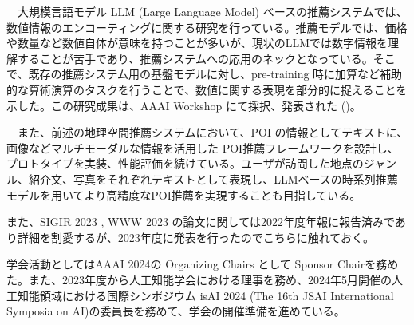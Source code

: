 　大規模言語モデル LLM (Large Language Model) ベースの推薦システムでは、数値情報のエンコーティングに関する研究を行っている。推薦モデルでは、価格や数量など数値自体が意味を持つことが多いが、現状のLLMでは数字情報を理解することが苦手であり、推薦システムへの応用のネックとなっている。そこで、既存の推薦システム用の基盤モデルに対し、pre-training 時に加算など補助的な算術演算のタスクを行うことで、数値に関する表現を部分的に捉えることを示した。この研究成果は、AAAI Workshop にて採択、発表された (\cite{num-aaai})。

　また、前述の地理空間推薦システムにおいて、POI の情報としてテキストに、画像などマルチモーダルな情報を活用した POI推薦フレームワークを設計し、プロトタイプを実装、性能評価を続けている。ユーザが訪問した地点のジャンル、紹介文、写真をそれぞれテキストとして表現し、LLMベースの時系列推薦モデルを用いてより高精度なPOI推薦を実現することも目指している。

また、SIGIR 2023 \cite{sigir}, WWW 2023 \cite{kg-kp}の論文に関しては2022年度年報に報告済みであり詳細を割愛するが、2023年度に発表を行ったのでこちらに触れておく。

学会活動としてはAAAI 2024の Organizing Chairs として Sponsor Chairを務めた。また、2023年度から人工知能学会における理事を務め、2024年5月開催の人工知能領域における国際シンポジウム isAI 2024 (The 16th JSAI International Symposia on AI)の委員長を務めて、学会の開催準備を進めている。





